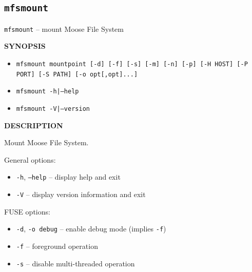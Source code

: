 \documentclass[a4paper,11pt,english]{report}
\def\code#1{\texttt{#1}}
\begin{document}
			\subsection{\code{mfsmount}}
				\code{mfsmount} -- mount Moose File System
				
				\bigskip
				\textbf{SYNOPSIS}
				\begin{itemize}
					\item \code{mfsmount  mountpoint  [-d] [-f] [-s] [-m] [-n] [-p] [-H HOST] [-P PORT] [-S PATH] [-o opt[,opt]...]}
					\item \code{mfsmount -h|--help}
					\item \code{mfsmount -V|--version}
				\end{itemize}
				
				\bigskip
				\textbf{DESCRIPTION}
				
				Mount Moose File System.
				\bigskip

				General options:
				\begin{itemize}
					\item \code{-h}, \code{--help} -- display help and exit
					\item \code{-V} -- display version information and exit
				\end{itemize}
				\bigskip
				
				FUSE options:
				\begin{itemize}
					\item \code{-d}, \code{-o debug} -- enable debug mode (implies \code{-f})
					\item \code{-f} -- foreground operation
					\item \code{-s} -- disable multi-threaded operation
				\end{itemize}
				\newpage
				
\end{document}
